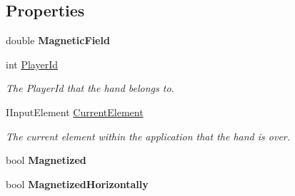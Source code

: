 \subsection*{Properties}
\begin{DoxyCompactItemize}
\item 
\hypertarget{class_microsoft_1_1_samples_1_1_kinect_1_1_basic_interactions_1_1_hand_position_a92f7cdb3860aa40ea5e7fca1e414fada}{double {\bfseries Magnetic\-Field}}\label{class_microsoft_1_1_samples_1_1_kinect_1_1_basic_interactions_1_1_hand_position_a92f7cdb3860aa40ea5e7fca1e414fada}

\item 
int \hyperlink{class_microsoft_1_1_samples_1_1_kinect_1_1_basic_interactions_1_1_hand_position_af24a0e27a6b07ad1390bab2ecd2eded9}{Player\-Id}
\begin{DoxyCompactList}\small\item\em The Player\-Id that the hand belongs to. \end{DoxyCompactList}\item 
I\-Input\-Element \hyperlink{class_microsoft_1_1_samples_1_1_kinect_1_1_basic_interactions_1_1_hand_position_a0642ac3c10c9795a47723332a1bdcbfd}{Current\-Element}
\begin{DoxyCompactList}\small\item\em The current element within the application that the hand is over. \end{DoxyCompactList}\item 
\hypertarget{class_microsoft_1_1_samples_1_1_kinect_1_1_basic_interactions_1_1_hand_position_a81639d9209d78997fd0c564885a44787}{bool {\bfseries Magnetized}}\label{class_microsoft_1_1_samples_1_1_kinect_1_1_basic_interactions_1_1_hand_position_a81639d9209d78997fd0c564885a44787}

\item 
\hypertarget{class_microsoft_1_1_samples_1_1_kinect_1_1_basic_interactions_1_1_hand_position_a96e8846a5d362401abba386882cd7016}{bool {\bfseries Magnetized\-Horizontally}}\label{class_microsoft_1_1_samples_1_1_kinect_1_1_basic_interactions_1_1_hand_position_a96e8846a5d362401abba386882cd7016}


\end{DoxyCompactItemize}
